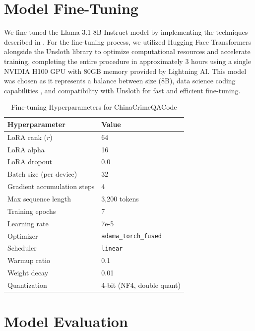 \section{Model Fine-Tuning}


We fine-tuned the Llama-3.1-8B Instruct model \citep{Grattafiori2024Llama3, Unsloth2024WhatModel} by implementing the techniques described in \cite{Pareja2024RecipesSFT}. For the fine-tuning process, we utilized Hugging Face Transformers alongside the Unsloth library to optimize computational resources and accelerate training, completing the entire procedure in approximately 3 hours using a single NVIDIA H100 GPU with 80GB memory provided by Lightning AI. This model was chosen as it represents a balance between size (8B), data science coding capabilities \citep{Lai2022DS1000}, and compatibility with Unsloth for fast and efficient fine-tuning.

\begin{table}[H]
\centering
\caption{Fine-tuning Hyperparameters for ChinaCrimeQACode}
\label{tab:hyperparameters}
\begin{tabular}{ll}
\toprule
\textbf{Hyperparameter} & \textbf{Value} \\
\midrule
LoRA rank ($r$) & 64 \\
LoRA alpha & 16 \\
LoRA dropout & 0.0 \\
Batch size (per device) & 32 \\
Gradient accumulation steps & 4 \\
Max sequence length & 3,200 tokens \\
Training epochs & 7 \\
Learning rate & 7e-5 \\
Optimizer & \texttt{adamw\_torch\_fused} \\
Scheduler & \texttt{linear} \\
Warmup ratio & 0.1 \\
Weight decay & 0.01 \\
Quantization & 4-bit (NF4, double quant) \\
\bottomrule
\end{tabular}
\end{table}

\section{Model Evaluation}

